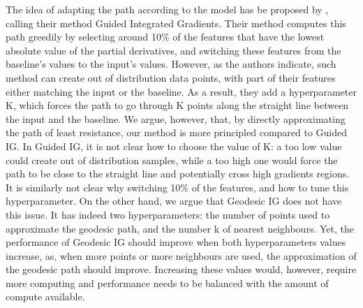 The idea of adapting the path according to the model has be proposed by \citet{kapishnikov2021guided}, calling their method Guided Integrated Gradients. Their method computes this path greedily by selecting around 10\% of the features that have the lowest absolute value of the partial derivatives, and switching these features from the baseline's values to the input's values. However, as the authors indicate, such method can create out of distribution data points, with part of their features either matching the input or the baseline. As a result, they add a hyperparameter K, which forces the path to go through K points along the straight line between the input and the baseline. 
We argue, however, that, by directly approximating the path of least resistance, our method is more principled compared to Guided IG. In Guided IG, it is not clear how to choose the value of K: a too low value could create out of distribution samples, while a too high one would force the path to be close to the straight line and potentially cross high gradients regions. It is similarly not clear why switching 10\% of the features, and how to tune this hyperparameter. On the other hand, we argue that Geodesic IG does not have this issue. It has indeed two hyperparameters: the number of points used to approximate the geodesic path, and the number k of nearest neighbours. Yet, the performance of Geodesic IG should improve when both hyperparameters values increase, as, when more points or more neighbours are used, the approximation of the geodesic path should improve. Increasing these values would, however, require more computing and performance needs to be balanced with the amount of compute available.